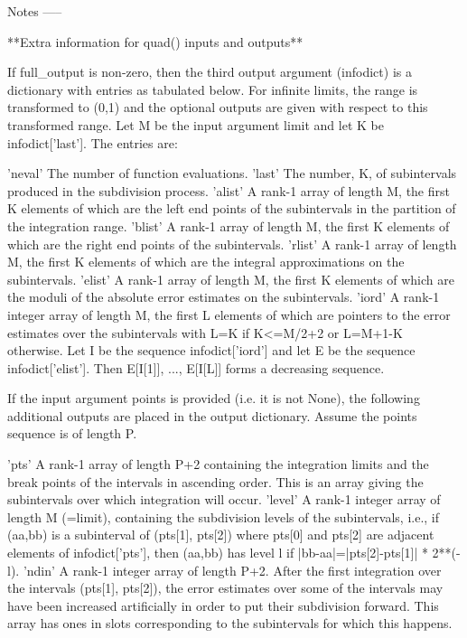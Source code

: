 \begin{DoxyVerb}
Notes
-----

**Extra information for quad() inputs and outputs**

If full_output is non-zero, then the third output argument
(infodict) is a dictionary with entries as tabulated below.  For
infinite limits, the range is transformed to (0,1) and the
optional outputs are given with respect to this transformed range.
Let M be the input argument limit and let K be infodict['last'].
The entries are:

'neval'
    The number of function evaluations.
'last'
    The number, K, of subintervals produced in the subdivision process.
'alist'
    A rank-1 array of length M, the first K elements of which are the
    left end points of the subintervals in the partition of the
    integration range.
'blist'
    A rank-1 array of length M, the first K elements of which are the
    right end points of the subintervals.
'rlist'
    A rank-1 array of length M, the first K elements of which are the
    integral approximations on the subintervals.
'elist'
    A rank-1 array of length M, the first K elements of which are the
    moduli of the absolute error estimates on the subintervals.
'iord'
    A rank-1 integer array of length M, the first L elements of
    which are pointers to the error estimates over the subintervals
    with L=K if K<=M/2+2 or L=M+1-K otherwise. Let I be the sequence
    infodict['iord'] and let E be the sequence infodict['elist'].
    Then E[I[1]], ..., E[I[L]] forms a decreasing sequence.

If the input argument points is provided (i.e. it is not None),
the following additional outputs are placed in the output
dictionary.  Assume the points sequence is of length P.

'pts'
    A rank-1 array of length P+2 containing the integration limits
    and the break points of the intervals in ascending order.
    This is an array giving the subintervals over which integration
    will occur.
'level'
    A rank-1 integer array of length M (=limit), containing the
    subdivision levels of the subintervals, i.e., if (aa,bb) is a
    subinterval of (pts[1], pts[2]) where pts[0] and pts[2] are
    adjacent elements of infodict['pts'], then (aa,bb) has level l if
    |bb-aa|=|pts[2]-pts[1]| * 2**(-l).
'ndin'
    A rank-1 integer array of length P+2.  After the first integration
    over the intervals (pts[1], pts[2]), the error estimates over some
    of the intervals may have been increased artificially in order to
    put their subdivision forward.  This array has ones in slots
    corresponding to the subintervals for which this happens.


\end{DoxyVerb}
